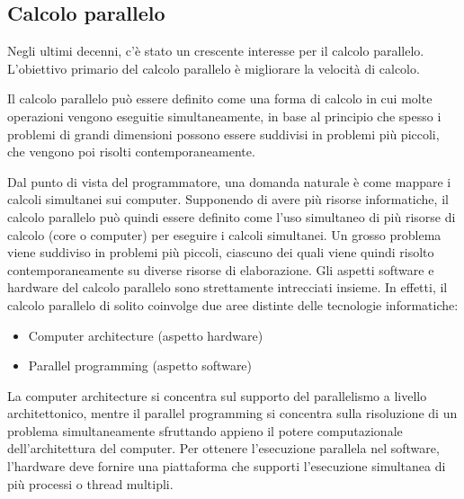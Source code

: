 \subsection{Calcolo parallelo}
Negli ultimi decenni, c'è stato un crescente interesse per il calcolo parallelo. L'obiettivo primario del calcolo parallelo è migliorare la velocità di calcolo.

Il calcolo parallelo può essere definito come una forma di calcolo in cui molte operazioni vengono eseguitie simultaneamente, in base al principio che spesso i problemi di grandi dimensioni possono essere suddivisi in problemi più piccoli, che vengono poi risolti contemporaneamente.

Dal punto di vista del programmatore, una domanda naturale è come mappare i calcoli simultanei sui computer. Supponendo di avere più risorse informatiche, il calcolo parallelo può quindi essere definito come l'uso simultaneo di più risorse di calcolo (core o computer) per eseguire i calcoli simultanei. Un grosso problema viene suddiviso in problemi più piccoli, ciascuno dei quali viene quindi risolto contemporaneamente su diverse risorse di elaborazione. Gli aspetti software e hardware del calcolo parallelo sono strettamente intrecciati insieme. In effetti, il calcolo parallelo di solito coinvolge due aree distinte delle tecnologie informatiche:
\begin{itemize}
	\item Computer architecture (aspetto hardware)
	\item Parallel programming (aspetto software)
\end{itemize}
La computer architecture si concentra sul supporto del parallelismo a livello architettonico, mentre il parallel programming si concentra sulla risoluzione di un problema simultaneamente sfruttando appieno il potere computazionale dell'architettura del computer. Per ottenere l'esecuzione parallela nel software, l'hardware deve fornire una piattaforma che supporti l'esecuzione simultanea di più processi o thread multipli.


